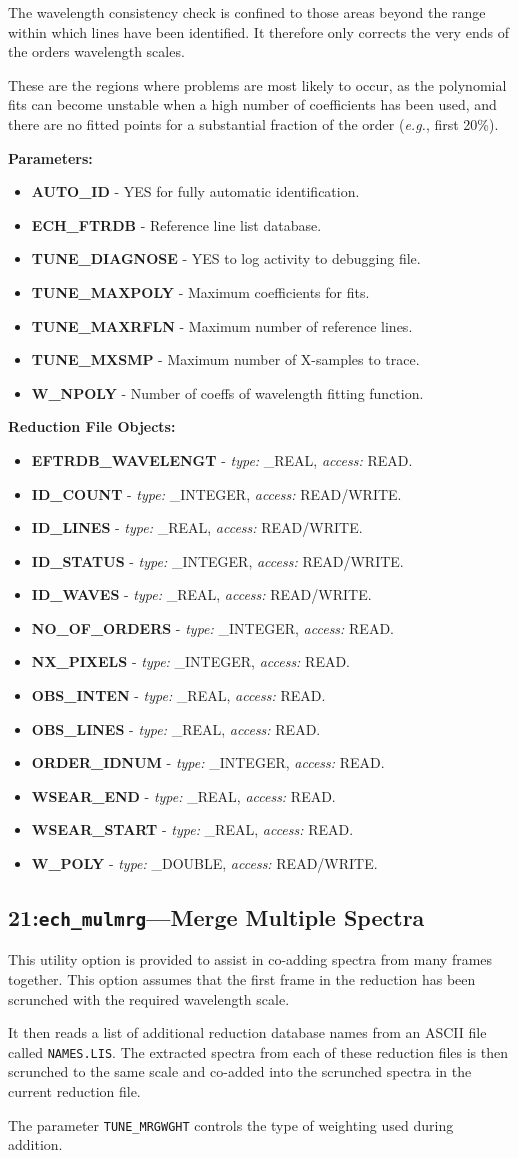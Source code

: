 \documentclass[11pt,twoside]{article}
\makeatletter
\newcommand{\stardocinitials}  {SUN}
\newcommand{\stardocnumber}    {152.4}
\newcommand{\stardocname}{\stardocinitials /\stardocnumber}
\newcommand{\htmlref}[2]{#1}
\newcommand{\xlabel}[1]{}
\newcommand{\myindex}[1]{\index{#1}}
\newcommand{\indexcmdname}[1]{\index{#1@\protect\cmdname{#1}}}
\renewcommand{\myindex}[1]{}
\renewcommand{\indexcmdname}[1]{}
\newcommand{\cmdname}{\begingroup \catcode`\_=12 \realcmdname}
\newcommand{\realcmdname}[1]{\endgroup\texttt{#1}}
\newlength{\sstbannerlength}
\newlength{\sstcaptionlength}
\newcommand{\echtask}[4]{
   \goodbreak
   \rule{\textwidth}{0.5mm}
   \vspace{-7ex}
   \newline
   \settowidth{\sstbannerlength}{{\Large {\bf #3}}}
   \setlength{\sstcaptionlength}{\textwidth}
   \addtolength{\sstbannerlength}{0.5em}
   \addtolength{\sstcaptionlength}{-2.0\sstbannerlength}
   \addtolength{\sstcaptionlength}{-5.0pt}
   \parbox[t]{\sstbannerlength}{\flushleft{\Large {\bf #3}}}
   \parbox[t]{\sstcaptionlength}{\center{\Large #4}}
   \parbox[t]{\sstbannerlength}{\flushright{\Large {\bf #3}}}
   \label{#1}\label{#2}
   \markboth{#3}{\stardocname}
   \uppercase{\myindex{#2@\protect\cmdname{#2}}}
}
\renewcommand{\echtask}[4]
{
  \subsection{\xlabel{#1}\xlabel{#2}\label{#1}\label{#2}#3---#4}
  \markboth{#3}{\stardocname}
}
\newcommand{\echpars}[1]{
{\bf Parameters:\vspace*{6pt}\\}
    #1
}
\renewcommand{\echpars}[1]{
{\bf Parameters:}
\begin{itemize}
#1
\end{itemize}
}
\newcommand{\epar}[3]
{
    \hspace*{5mm}\makebox[50mm][l]{\bf #1} #2 (p~\pageref{par_#3}.)\\
}
\renewcommand{\epar}[3]
{\item \htmlref{{\bf #1}}{par_#3} - #2}
\newcommand{\lepar}[3]
{
    \hspace*{5mm}\makebox[50mm][l]{\bf #1} #2 (p~\pageref{par_#3}.)
}
\renewcommand{\lepar}[3]
{\item \htmlref{{\bf #1}}{par_#3} - #2}
\newcommand{\echredobj}[1]{
{\bf Reduction File Objects:\vspace*{6pt}\\}
      \hspace*{5mm}\makebox[50mm][l]{Object}\makebox[25mm][l]{Type}{Access}\\
      #1
}
\renewcommand{\echredobj}[1]{
{\bf Reduction File Objects:}
\begin{itemize}
#1
\end{itemize}
}
\newcommand{\eobj}[3]
{
    \hspace*{5mm}\makebox[50mm][l]{\bf #1}\makebox[25mm][l]{\tt #2}{\tt #3}\\
}
\renewcommand{\eobj}[3]
{\item {\bf #1} - {\it type:} #2, {\it access:} #3.}
\newcommand{\leobj}[3]
{
    \hspace*{5mm}\makebox[50mm][l]{\bf #1}\makebox[25mm][l]{\tt #2}{\tt #3}
}
\renewcommand{\leobj}[3]
{\item {\bf #1} - {\it type:} #2, {\it access:} #3.}
\makeatother
\begin{document}
The wavelength consistency check is confined to those areas beyond the
range within which lines have been identified. It therefore only corrects
the very ends of the orders wavelength scales.

These are the regions where problems are most likely to occur,  as the
polynomial fits can become unstable when a high number of coefficients has
been used, and there are no fitted points for a substantial fraction of the
order ({\it{e.g.}}, first 20\%).

\echpars{
\epar{AUTO\_ID}{YES for fully automatic identification.}{AUTO_ID}
\epar{ECH\_FTRDB}{Reference line list database.}{ECH_FTRDB}
\epar{TUNE\_DIAGNOSE}{YES to log activity to debugging file.}{TUNE_DIAGNOSE}
\epar{TUNE\_MAXPOLY}{Maximum coefficients for fits.}{TUNE_MAXPOLY}
\epar{TUNE\_MAXRFLN}{Maximum number of reference lines.}{TUNE_MAXRFLN}
\epar{TUNE\_MXSMP}{Maximum number of X-samples to trace.}{TUNE_MXSMP}
\lepar{W\_NPOLY}{Number of coeffs of wavelength fitting function.}{W_NPOLY}
}


\echredobj{
\eobj{EFTRDB\_WAVELENGT}{\_REAL}{READ}
\eobj{ID\_COUNT}{\_INTEGER}{READ/WRITE}
\eobj{ID\_LINES}{\_REAL}{READ/WRITE}
\eobj{ID\_STATUS}{\_INTEGER}{READ/WRITE}
\eobj{ID\_WAVES}{\_REAL}{READ/WRITE}
\eobj{NO\_OF\_ORDERS}{\_INTEGER}{READ}
\eobj{NX\_PIXELS}{\_INTEGER}{READ}
\eobj{OBS\_INTEN}{\_REAL}{READ}
\eobj{OBS\_LINES}{\_REAL}{READ}
\eobj{ORDER\_IDNUM}{\_INTEGER}{READ}
\eobj{WSEAR\_END}{\_REAL}{READ}
\eobj{WSEAR\_START}{\_REAL}{READ}
\leobj{W\_POLY}{\_DOUBLE}{READ/WRITE}
}


\echtask{option21}{ech_mulmrg}{21:{\tt ech\_mulmrg}}{Merge Multiple Spectra}
\myindex{Merge multiple spectra}
\myindex{Multiple object frames}

This utility option is provided to assist in co-adding spectra from many
frames together. This option assumes that the first frame in the reduction
has been scrunched with the required wavelength scale.

It then reads a list of additional reduction database names from an
ASCII file called {\tt NAMES.LIS}. The extracted spectra from each of these
reduction files is then scrunched to the same scale and co-added into the
scrunched spectra in the current reduction file.

The parameter \htmlref{{\tt TUNE\_MRGWGHT}}{par_TUNE_MRGWGHT}
\indexcmdname{TUNE_MRGWGHT} controls the type of weighting used during addition.
\end{document}
